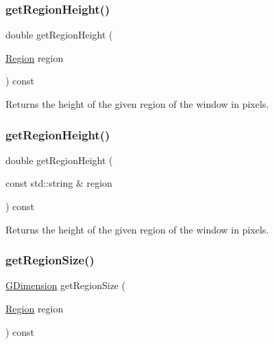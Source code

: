 \subsubsection{\texorpdfstring{get\+Region\+Height()}{getRegionHeight()}\hspace{0.1cm}{\footnotesize\ttfamily [1/2]}}
{\footnotesize\ttfamily double get\+Region\+Height (\begin{DoxyParamCaption}\item[{\mbox{\hyperlink{classsgl_1_1GWindow_a81a01a86de31071a92e6cce0bab9bc4b}{Region}}}]{region }\end{DoxyParamCaption}) const\hspace{0.3cm}{\ttfamily [virtual]}}



Returns the height of the given region of the window in pixels. 

\mbox{\label{classsgl_1_1GWindow_ae8a545e772745b89edaf9804a2dc0057}} 
\subsubsection{\texorpdfstring{get\+Region\+Height()}{getRegionHeight()}\hspace{0.1cm}{\footnotesize\ttfamily [2/2]}}
{\footnotesize\ttfamily double get\+Region\+Height (\begin{DoxyParamCaption}\item[{const std\+::string \&}]{region }\end{DoxyParamCaption}) const\hspace{0.3cm}{\ttfamily [virtual]}}



Returns the height of the given region of the window in pixels. 

\mbox{\label{classsgl_1_1GWindow_a3b5db9ffbd4b32260f80634f162dba4e}} 
\subsubsection{\texorpdfstring{get\+Region\+Size()}{getRegionSize()}\hspace{0.1cm}{\footnotesize\ttfamily [1/2]}}
{\footnotesize\ttfamily \mbox{\hyperlink{structsgl_1_1GDimension}{G\+Dimension}} get\+Region\+Size (\begin{DoxyParamCaption}\item[{\mbox{\hyperlink{classsgl_1_1GWindow_a81a01a86de31071a92e6cce0bab9bc4b}{Region}}}]{region }\end{DoxyParamCaption}) const\hspace{0.3cm}{\ttfamily [virtual]}}



